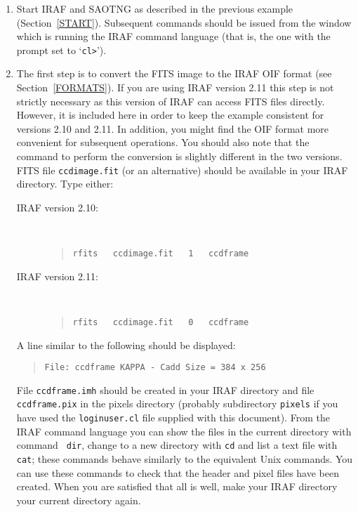 \documentclass[twoside,11pt]{article}
\begin{document}
\begin{enumerate}

  \item Start IRAF and SAOTNG as described in the previous example
   (Section~\ref{START}).  Subsequent commands should be issued from
   the window which is running the IRAF command language (that is, the
   one with the prompt set to `\verb-cl>-').

  \item The first step is to convert the FITS image to the IRAF OIF
   format (see Section~\ref{FORMATS}).  If you are using IRAF version 2.11
   this step is not strictly necessary as this version of IRAF can access
   FITS files directly.  However, it is included here in order to
   keep the example consistent for versions 2.10 and 2.11.  In addition,
   you might find the OIF format more convenient for subsequent operations.
   You should also note that the command to perform the conversion is
   slightly different in the two versions.  FITS file {\tt ccdimage.fit}
   (or an alternative) should be available in your IRAF directory.
   Type either:

  \begin{description}

    \item[{\rm IRAF version 2.10:}] ~

    \begin{quote}
     {\tt rfits ~ ccdimage.fit ~ 1 ~ ccdframe}
    \end{quote}

    \item[{\rm IRAF version 2.11:}] ~

    \begin{quote}
     {\tt rfits ~ ccdimage.fit ~ 0 ~ ccdframe}
    \end{quote}

  \end{description}

   A line similar to the following should be displayed:

  \begin{quote}
   {\tt File: ccdframe  KAPPA - Cadd          Size = 384 x 256}
  \end{quote}

   File {\tt ccdframe.imh} should be created in your IRAF directory
   and file {\tt ccdframe.pix} in the pixels directory (probably
   subdirectory {\tt pixels} if you have used the {\tt loginuser.cl}
   file supplied with this document).  From the IRAF command language 
   you can show the files in the current directory with command {\tt
   dir}, change to a new directory with {\tt cd} and list a text
   file with {\tt cat}; these commands behave similarly to the
   equivalent Unix commands.  You can use these commands to check
   that the header and pixel files have been created.  When you are
   satisfied that all is well, make your IRAF directory your current
   directory again.


\end{enumerate}
\end{document}
